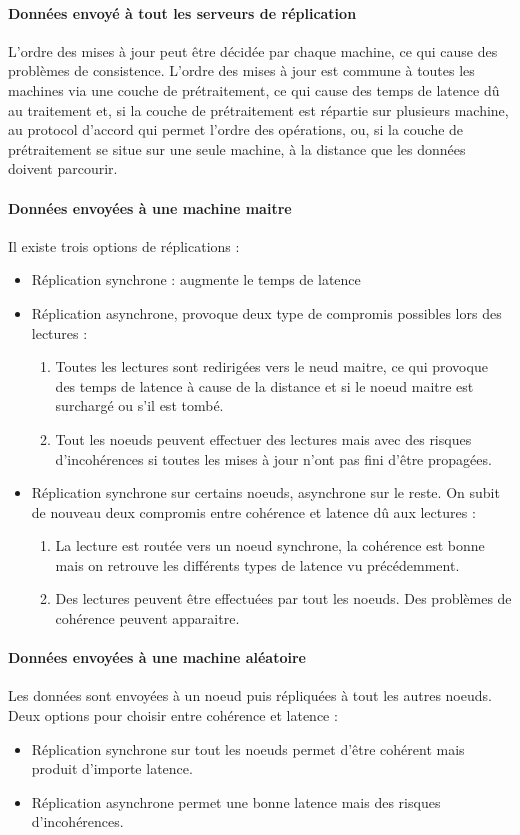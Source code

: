 \paragraph{Données envoyé à tout les serveurs de réplication}
L'ordre des mises à jour peut être décidée par chaque machine, ce qui cause des problèmes de consistence.
L'ordre des mises à jour est commune à toutes les machines via une couche de prétraitement, ce qui cause des temps de latence dû au traitement et, si la couche de prétraitement est répartie sur plusieurs machine, au protocol d'accord qui permet l'ordre des opérations, ou, si la couche de prétraitement se situe sur une seule machine, à la distance que les données doivent parcourir.


\paragraph{Données envoyées à une machine maitre}
Il existe trois options de réplications :
\begin{itemize}
\item Réplication synchrone : augmente le temps de latence
\item Réplication asynchrone, provoque deux type de compromis possibles lors des lectures :
\begin{enumerate}
\item Toutes les lectures sont redirigées vers le neud maitre, ce qui provoque des temps de latence à cause de la distance et si le noeud maitre est surchargé ou s'il est tombé.
\item Tout les noeuds peuvent effectuer des lectures mais avec des risques d'incohérences si toutes les mises à jour n'ont pas fini d'être propagées.
\end{enumerate}
\item Réplication synchrone sur certains noeuds, asynchrone sur le reste. On subit de nouveau deux compromis entre cohérence et latence dû aux lectures :
\begin{enumerate}
\item La lecture est routée vers un noeud synchrone, la cohérence est bonne mais on retrouve les différents types de latence vu précédemment.
\item Des lectures peuvent être effectuées par tout les noeuds. Des problèmes de cohérence peuvent apparaitre.
\end{enumerate}
\end{itemize}

\paragraph{Données envoyées à une machine aléatoire}
Les données sont envoyées à un noeud puis répliquées à tout les autres noeuds.
Deux options pour choisir entre cohérence et latence :
\begin{itemize}
\item Réplication synchrone sur tout les noeuds permet d'être cohérent mais produit d'importe latence.
\item Réplication asynchrone permet une bonne latence mais des risques d'incohérences.
\end{itemize}

